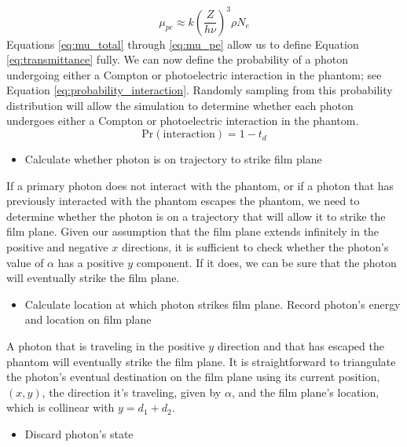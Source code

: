 \documentclass[12pt]{article} %
\begin{document}
\begin{equation}
\mu_{pe} \approx k\left(\frac{Z}{h\nu}\right)^3\rho N_{e}
\label{eq:mu_pe}
\end{equation}
Equations \ref{eq:mu_total} through \ref{eq:mu_pe} allow us to define Equation \ref{eq:transmittance} fully. We can now define the probability of a photon undergoing either a Compton or photoelectric interaction in the phantom; see Equation \ref{eq:probability_interaction}. Randomly sampling from this probability distribution will allow the simulation to determine whether each photon undergoes either a Compton or photoelectric interaction in the phantom.
\begin{equation}
\text{Pr}(\text{interaction}) = 1 - t_{d}
\label{eq:probability_interaction}
\end{equation}
\begin{itemize}
\item Calculate whether photon is on trajectory to strike film plane
\end{itemize}

If a primary photon does not interact with the phantom, or if a photon that has previously interacted with the phantom escapes the phantom, we need to determine whether the photon is on a trajectory that will allow it to strike the film plane. Given our assumption that the film plane extends infinitely in the positive and negative $x$ directions, it is sufficient to check whether the photon's value of $\alpha$ has a positive $y$ component. If it does, we can be sure that the photon will eventually strike the film plane.

\begin{itemize}
\item Calculate location at which photon strikes film plane. Record photon's energy and location on film plane
\end{itemize}

A photon that is traveling in the positive $y$ direction and that has escaped the phantom will eventually strike the film plane. It is straightforward to triangulate the photon's eventual destination on the film plane using its current position, $(x, y)$, the direction it's traveling, given by $\alpha$, and the film plane's location, which is collinear with $y = d_1 + d_2$.

\begin{itemize}
\item Discard photon's state
\end{itemize}
\end{document}
